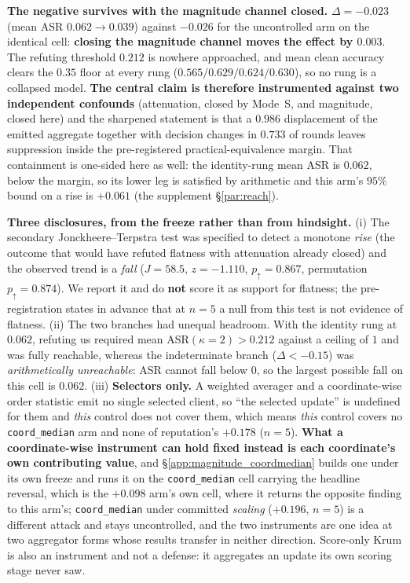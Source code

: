 \documentclass{article}
\begin{document}
\textbf{The negative survives with the magnitude channel closed.} $\Delta = \mathbf{-0.023}$ (mean ASR $0.062 \to 0.039$) against $-0.026$ for the uncontrolled arm on the identical cell: \textbf{closing the magnitude channel moves the effect by $0.003$}. The refuting threshold $0.212$ is nowhere approached, and mean clean accuracy clears the $0.35$ floor at every rung ($0.565/0.629/0.624/0.630$), so no rung is a collapsed model. \textbf{The central claim is therefore instrumented against two independent confounds} (attenuation, closed by Mode~S, and magnitude, closed here) and the sharpened statement is that a $0.986$ displacement of the emitted aggregate together with decision changes in $0.733$ of rounds leaves suppression inside the pre-registered practical-equivalence margin. That containment is one-sided here as well: the identity-rung mean ASR is $0.062$, below the margin, so its lower leg is satisfied by arithmetic and this arm's $95\%$ bound on a rise is $+0.061$ (the supplement §\ref{par:reach}).

\textbf{Three disclosures, from the freeze rather than from hindsight.} (i) The secondary Jonckheere--Terpstra test was specified to detect a monotone \emph{rise} (the outcome that would have refuted flatness with attenuation already closed) and the observed trend is a \emph{fall} ($J{=}58.5$, $z{=}{-}1.110$, $p_{\uparrow}{=}0.867$, permutation $p_{\uparrow}{=}0.874$). We report it and do \textbf{not} score it as support for flatness; the pre-registration states in advance that at $n{=}5$ a null from this test is not evidence of flatness. (ii) The two branches had unequal headroom. With the identity rung at $0.062$, refuting us required mean ASR$(\kappa{=}2) > 0.212$ against a ceiling of $1$ and was fully reachable, whereas the indeterminate branch ($\Delta < -0.15$) was \emph{arithmetically unreachable}: ASR cannot fall below $0$, so the largest possible fall on this cell is $0.062$. (iii) \textbf{Selectors only.} A weighted averager and a coordinate-wise order statistic emit no single selected client, so ``the selected update'' is undefined for them and \emph{this} control does not cover them, which means \emph{this} control covers no \texttt{coord\_median} arm and none of reputation's $+0.178$ ($n{=}5$). \textbf{What a coordinate-wise instrument can hold fixed instead is each coordinate's own contributing value}, and §\ref{app:magnitude_coordmedian} builds one under its own freeze and runs it on the \texttt{coord\_median} cell carrying the headline reversal, which is the $+0.098$ arm's own cell, where it returns the opposite finding to this arm's; \texttt{coord\_median} under committed \emph{scaling} ($+0.196$, $n{=}5$) is a different attack and stays uncontrolled, and the two instruments are one idea at two aggregator forms whose results transfer in neither direction. Score-only Krum is also an instrument and not a defense: it aggregates an update its own scoring stage never saw.
\end{document}
